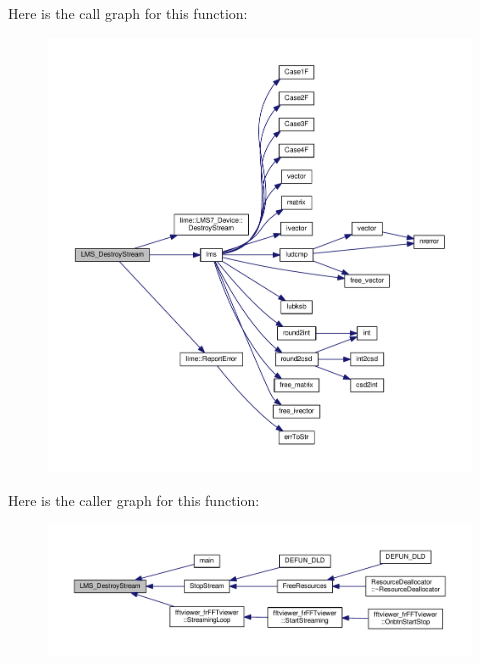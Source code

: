 Here is the call graph for this function\+:
\nopagebreak
\begin{figure}[H]
\begin{center}
\leavevmode
\includegraphics[width=350pt]{df/de1/lms7__api_8cpp_aec228383d063d7eaa75b8aa6498daff9_cgraph}
\end{center}
\end{figure}




Here is the caller graph for this function\+:
\nopagebreak
\begin{figure}[H]
\begin{center}
\leavevmode
\includegraphics[width=350pt]{df/de1/lms7__api_8cpp_aec228383d063d7eaa75b8aa6498daff9_icgraph}
\end{center}
\end{figure}



